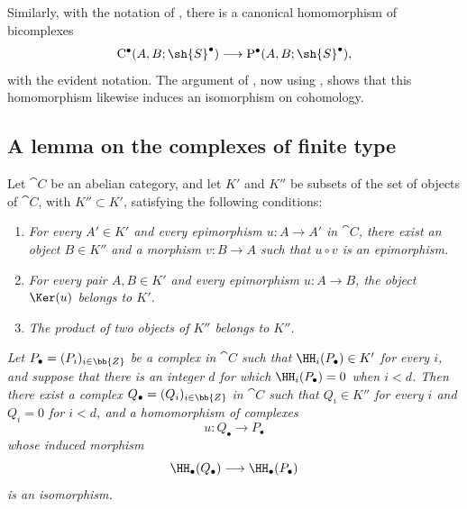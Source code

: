 \begin{env}[11.8.10]
\label{0.11.8.10}
Similarly, with the notation of , there is a canonical
homomorphism of bicomplexes
\[
  \mathrm{C}^\bullet(A,B;\sh{S}^\bullet)
  \longrightarrow
  \mathrm{P}^\bullet(A,B;\sh{S}^\bullet),
\]
with the evident notation.
The argument of , now using , shows that
this homomorphism likewise induces an isomorphism on cohomology.
\end{env}

\subsection{A lemma on the complexes of finite type}
\label{subsection:0.11.9}

\begin{proposition}[11.9.1]
\label{0.11.9.1}
Let $\cat{C}$ be an abelian category, and let $K'$ and $K''$ be subsets
of the set of objects of $\cat{C}$, with $K''\subset K'$, satisfying the
following conditions:
\begin{enumerate}
  \item[{\rm(i)}]
  \emph{For every $A'\in K'$ and every epimorphism $u:A\to A'$ in
  $\cat{C}$, there exist an object $B\in K''$ and a morphism $v:B\to A$
  such that $u\circ v$ is an epimorphism.}

  \item[{\rm(ii)}]
  \emph{For every pair $A,B\in K'$ and every epimorphism $u:A\to B$,
  the object $\Ker(u)$ belongs to $K'$.}

  \item[{\rm(iii)}]
  \emph{The product of two objects of $K''$ belongs to $K''$.}
\end{enumerate}

\emph{Let $P_\bullet=(P_i)_{i\in\bb{Z}}$ be a complex in $\cat{C}$ such
that $\HH_i(P_\bullet)\in K'$ for every $i$, and suppose that there is an
integer $d$ for which $\HH_i(P_\bullet)=0$ when $i<d$.
Then there exist a complex $Q_\bullet=(Q_i)_{i\in\bb{Z}}$ in $\cat{C}$
such that $Q_i\in K''$ for every $i$ and $Q_i=0$ for $i<d$, and a
homomorphism of complexes
\[
  u:Q_\bullet\longrightarrow P_\bullet
\]
whose induced morphism
\[
  \HH_\bullet(Q_\bullet)\longrightarrow\HH_\bullet(P_\bullet)
\]
is an isomorphism.}
\end{proposition}

